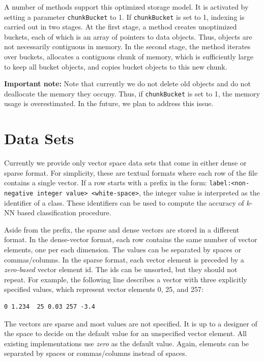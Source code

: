 \documentclass[runningheads,a4paper]{llncs}
\newcommand{\todonoteinline}[1]{\todo[color=red!40,inline,caption={TODO}]{#1}}
\newcommand{\ttt}[1]{\texttt{#1}}
\newcommand{\knn}{$k$-NN }
\begin{document}
A number of methods support this optimized storage model.
It is activated by setting a parameter \ttt{chunkBucket} to 1.
If \ttt{chunkBucket} is set to 1, indexing is carried out in two stages.
At the first stage, a method creates unoptimized buckets,
each of which is an array of pointers to data objects.
Thus, objects are not necessarily contiguous in memory.
In the second stage, the method iterates over buckets,
allocates a contiguous chunk of memory,
which is sufficiently large to keep all bucket objects,
and copies bucket objects to this new chunk.

\textbf{Important note:}
Note that currently we do not delete old objects and do not deallocate the memory 
they occupy. Thus, 
if 
\ttt{chunkBucket} is set to 1,
the memory usage is overestimated.
In the future, we plan to address this issue.

\section{Data Sets}
\label{SectionDatasets}
Currently we provide only vector space data sets 
that come in either dense or sparse format.
For simplicity, these are textual formats where each row of the file contains a single vector.
If a row starts with a prefix in the form: \ttt{label:<non-negative integer value> <white-space>},
the integer value is interpreted as the identifier of a class.
These identifiers can be used to compute the accuracy of \knn based classification procedure.

Aside from the prefix, the sparse and dense vectors are stored in a different format.
In the dense-vector format, each row
contains the same number of vector elements, one per each dimension.
The values can be separated by spaces or commas/columns.
In the sparse format, each vector element is preceded
by a \emph{zero-based} vector element id. 
The ids can be unsorted, but they should not repeat.
For example, the following line
describes a vector with three explicitly specified values,
which represent vector elements 0, 25, and 257:
\begin{verbatim}
0 1.234  25 0.03 257 -3.4 
\end{verbatim}

The vectors are sparse and most values are not specified.
It is up to a designer of the space to decide on the default value for an unspecified vector element.
All existing implementations use \emph{zero} as the default value.
Again, elements can be separated by spaces or commas/columns instead of spaces.
\end{document}
